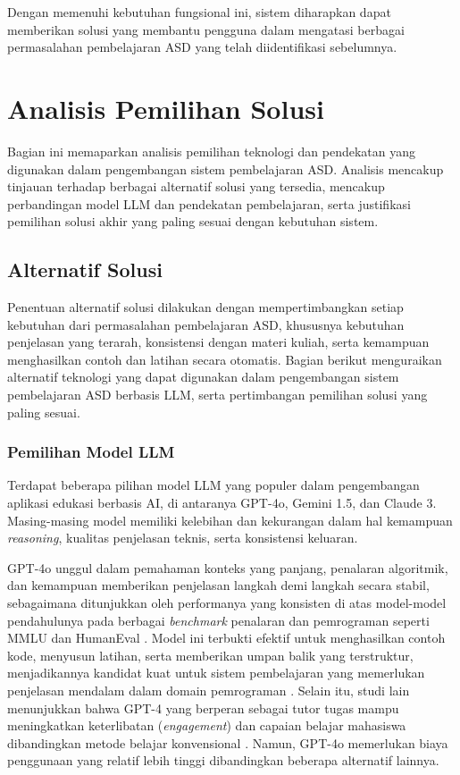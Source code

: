 Dengan memenuhi kebutuhan fungsional ini, sistem diharapkan dapat memberikan solusi yang membantu pengguna dalam mengatasi berbagai permasalahan pembelajaran ASD yang telah diidentifikasi sebelumnya.




\section{Analisis Pemilihan Solusi}

Bagian ini memaparkan analisis pemilihan teknologi dan pendekatan yang digunakan dalam pengembangan sistem pembelajaran ASD. Analisis mencakup tinjauan terhadap berbagai alternatif solusi yang tersedia, mencakup perbandingan model LLM dan pendekatan pembelajaran, serta justifikasi pemilihan solusi akhir yang paling sesuai dengan kebutuhan sistem.

\subsection{Alternatif Solusi}

Penentuan alternatif solusi dilakukan dengan mempertimbangkan setiap kebutuhan dari permasalahan pembelajaran ASD, khususnya kebutuhan penjelasan yang terarah, konsistensi dengan materi kuliah, serta kemampuan menghasilkan contoh dan latihan secara otomatis. Bagian berikut menguraikan alternatif teknologi yang dapat digunakan dalam pengembangan sistem pembelajaran ASD berbasis LLM, serta pertimbangan pemilihan solusi yang paling sesuai.

\subsubsection{Pemilihan Model LLM}

Terdapat beberapa pilihan model LLM yang populer dalam pengembangan aplikasi edukasi berbasis AI, di antaranya GPT-4o, Gemini 1.5, dan Claude 3. Masing-masing model memiliki kelebihan dan kekurangan dalam hal kemampuan \textit{reasoning}, kualitas penjelasan teknis, serta konsistensi keluaran.

GPT-4o unggul dalam pemahaman konteks yang panjang, penalaran algoritmik, dan kemampuan memberikan penjelasan langkah demi langkah secara stabil, sebagaimana ditunjukkan oleh performanya yang konsisten di atas model-model pendahulunya pada berbagai \textit{benchmark} penalaran dan pemrograman seperti MMLU dan HumanEval \autocite{OpenAI2023GPT4TechnicalReport}. Model ini terbukti efektif untuk menghasilkan contoh kode, menyusun latihan, serta memberikan umpan balik yang terstruktur, menjadikannya kandidat kuat untuk sistem pembelajaran yang memerlukan penjelasan mendalam dalam domain pemrograman \autocite{Jacobs2024LLMFeedbackProgramming}. Selain itu, studi lain menunjukkan bahwa GPT-4 yang berperan sebagai tutor tugas mampu meningkatkan keterlibatan (\textit{engagement}) dan capaian belajar mahasiswa dibandingkan metode belajar konvensional \autocite{Vanzo2024GPT4HomeworkTutor}. Namun, GPT-4o memerlukan biaya penggunaan yang relatif lebih tinggi dibandingkan beberapa alternatif lainnya.

